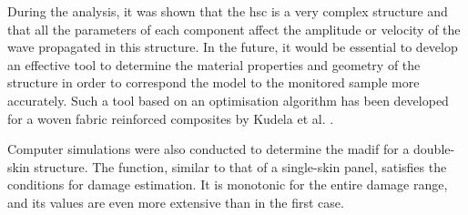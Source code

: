 During the analysis, it was shown that the \ac{hsc} is a very complex structure and that all the parameters of each component affect the amplitude or velocity of the wave propagated in this structure.
In the future, it would be essential to develop an effective tool to determine the material properties and geometry of the structure in order to correspond the model to the monitored sample more accurately.
Such a tool based on an optimisation algorithm has been developed for a woven fabric reinforced composites by Kudela et al. \cite{kudela2020elastic}.

Computer simulations were also conducted to determine the \ac{madif} for a double-skin structure.
The function, similar to that of a single-skin panel, satisfies the conditions for damage estimation.
It is monotonic for the entire damage range, and its values are even more extensive than in the first case.